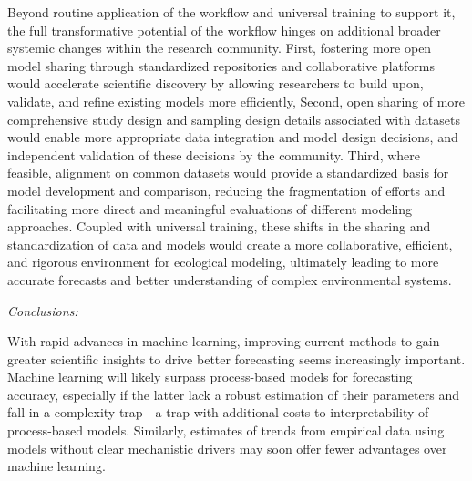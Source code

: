 \documentclass[11pt]{article}
\newcommand{\llabel}[1]{\hypertarget{lintarget:#1}{}\linelabel{lin:#1}}
\begin{document}
\llabel{studydesignandmore}Beyond routine application of the workflow and universal training to support it, the full transformative potential of the workflow hinges on additional broader systemic changes within the research community. First, fostering more open model sharing through standardized repositories and collaborative platforms would accelerate scientific discovery by allowing researchers to build upon, validate, and refine existing models more efficiently, Second, open sharing of more comprehensive study design and sampling design details associated with datasets would enable more appropriate data integration and model design decisions, and independent validation of these decisions by the community. Third, where feasible, alignment on common datasets would provide a standardized basis for model development and comparison, reducing the fragmentation of efforts and facilitating more direct and meaningful evaluations of different modeling approaches. Coupled with universal training, these shifts in the sharing and standardization of data and models would create a more collaborative, efficient, and rigorous environment for ecological modeling, ultimately leading to more accurate forecasts and better understanding of complex environmental systems.

\emph{Conclusions:} 

With rapid advances in machine learning, improving current methods to gain greater scientific insights to drive better forecasting seems increasingly important. \llabel{MLvsPBM}Machine learning will likely surpass process-based models for forecasting accuracy, especially if the latter lack a robust estimation of their parameters and fall in a complexity trap---a trap with additional costs to interpretability of process-based models. Similarly, estimates of trends from empirical data using models without clear mechanistic drivers may soon offer fewer advantages over machine learning. 

\end{document}
